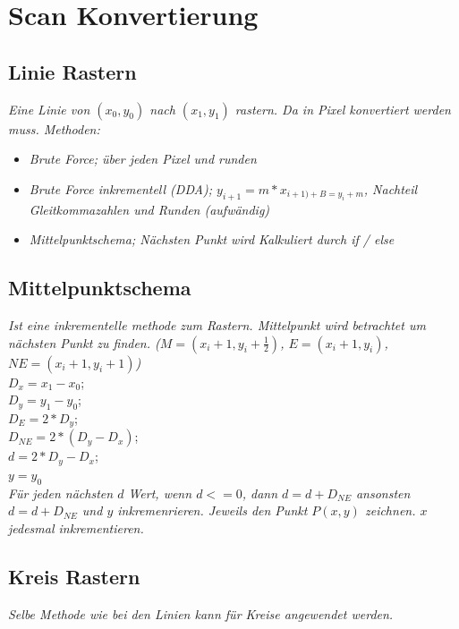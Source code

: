 \section{Scan Konvertierung}

\subsection{Linie Rastern}

\textit{Eine Linie von $(x_0, y_0)$ nach $(x_1, y_1)$ rastern. Da in Pixel konvertiert werden muss. Methoden:}

\begin{itemize}
    \item \textit{Brute Force; über jeden Pixel und runden}
    \item \textit{Brute Force inkrementell (DDA); $y_{i+1} = m * x_{i+1) + B = y_i + m}$,
          Nachteil Gleitkommazahlen und Runden (aufwändig)}
    \item \textit{Mittelpunktschema; Nächsten Punkt wird Kalkuliert durch if / else}
\end{itemize}

\subsection{Mittelpunktschema}

\textit{Ist eine inkrementelle methode zum Rastern. Mittelpunkt
wird betrachtet um nächsten Punkt zu finden. ($M = (x_i+1, y_i+\frac{1}{2})$, $E = (x_i+1, y_i)$, $NE = (x_i+1, y_i+1)$)}\\

$D_x = x_1 - x_0$; \\
$D_y = y_1 - y_0$; \\
$D_E = 2 * D_y$; \\
$D_{NE} = 2 * (D_y - D_x)$; \\
$d = 2*D_y - D_x$; \\
$y = y_0$ \\

\textit{
    Für jeden nächsten $d$ Wert, wenn $d <= 0$,
    dann $d = d + D_{NE}$ ansonsten $d = d + D_{NE}$ und $y$ inkremenrieren.
    Jeweils den Punkt $P(x,y)$ zeichnen. $x$ jedesmal inkrementieren.
}

\subsection{Kreis Rastern}

\textit{Selbe Methode wie bei den Linien kann für Kreise angewendet werden.}

